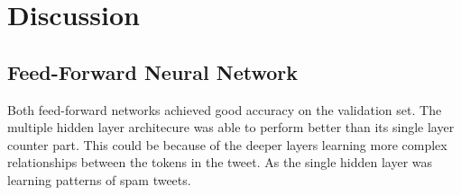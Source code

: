 \section{Discussion}
\label{sec:discussion}

\subsection{Feed-Forward Neural Network} Both feed-forward networks
achieved good accuracy on the validation set. The multiple hidden
layer architecure was able to perform better than its single layer
counter part. This could be because of the deeper layers learning more
complex relationships between the tokens in the tweet. As the single
hidden layer was learning patterns of spam tweets.
